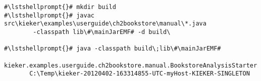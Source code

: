 \begin{lstlisting}[caption=Commands to compile and run the analysis under Windows,label=lst:bookstoreAnalysisStarterWin]
#\lstshellprompt{}# mkdir build
#\lstshellprompt{}# javac src\kieker\examples\userguide\ch2bookstore\manual\*.java 
        -classpath lib\#\mainJarEMF# -d build\

#\lstshellprompt{}# java -classpath build\;lib\#\mainJarEMF#
       kieker.examples.userguide.ch2bookstore.manual.BookstoreAnalysisStarter 
       C:\Temp\kieker-20120402-163314855-UTC-myHost-KIEKER-SINGLETON
\end{lstlisting}	